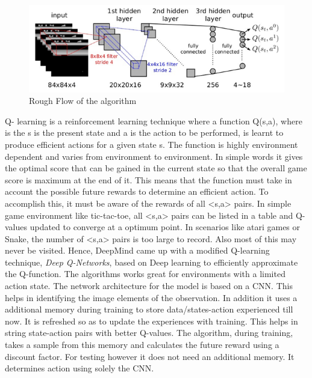 \documentclass[conference,10pt]{IEEEtran}
\begin{document}
	\begin{figure}[]
		
		\includegraphics[width=\linewidth]{pmodel.png}
		\caption{Rough Flow of the algorithm}
		\label{pmodel}
		
	\end{figure}
	Q- learning is a reinforcement learning technique where a function Q(s,a), where is the s is the present state and a is the action to be performed, is learnt to produce efficient actions for a given state s. The function is highly environment dependent and varies from environment to environment. 
	\break
	\break
	In simple words it gives the optimal score that can be gained in the current state so that the overall game score is maximum at the end of it. This means that the function must take in account the possible future rewards to determine an efficient action. To accomplish this, it must be aware of the rewards of all <s,a> pairs.
	\break
	\break
	 In simple game environment like tic-tac-toe, all <s,a> pairs can be listed in a table and Q-values updated to converge at a optimum point. In scenarios like atari games or Snake, the number of <s,a> pairs is too large to record. Also most of this may never be visited. Hence, DeepMind came up with a modified Q-learning technique, \textit{Deep Q-Networks}, based on Deep learning to efficiently approximate the Q-function. The algorithms works great for environments with a limited action state. 
	 \break
	 \break
	 The network architecture for the model is based on a CNN. This helps in identifying the image elements of the observation. In addition it uses a additional memory during training to store data/states-action experienced till now. It is refreshed so as to update the experiences with training. This helps in string state-action pairs with better Q-values. The algorithm, during training, takes a sample from this memory and calculates the future reward using a discount factor.
	 \break
	 \break
	  For testing however it does not need an additional memory. It determines action using solely the CNN. 
\end{document}
